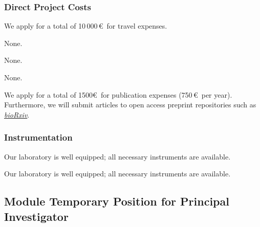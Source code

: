 \documentclass[final]{scrartcl}
\begin{document}
\subsubsection{Direct Project Costs}
\begin{funds}



We apply for a total of 10\,000\,\euro\ for travel expenses.

None.

None.

None.

We apply for a total of 1500\euro\ for publication expenses (750\,\euro\ per
year). Furthermore, we will submit articles to open access preprint repositories
such as \href{https://www.biorxiv.org/}{\textit{bioRxiv}}.

\end{funds}

\subsubsection{Instrumentation}

Our laboratory is well equipped; all necessary instruments are available.

Our laboratory is well equipped; all necessary instruments are available.



\vspace*{2cm}

\subsection{Module Temporary Position for Principal Investigator}
\end{document}
